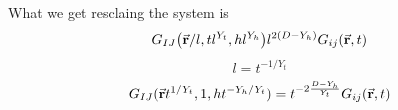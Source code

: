 \documentclass[../main/main.tex]{subfiles}
\begin{document}
What we get resclaing the system is
\begin{equation}
  G_{IJ} \qty(\va{r}/l, t l ^{Y_t}, h l^{Y_h}) l^{2(D-Y_h)} G_{ij} (\va{r},t)
\end{equation}
\begin{equation}
  l = t^{-1/Y_t}
\end{equation}
\begin{equation}
  G_{IJ} (\va{r} t^{1/Y_t}, 1, h t^{-Y_h/Y_t}) = t^{-2 \frac{D- Y_h}{Y_t}} G_{ij} (\va{r},t)
\end{equation}
\end{document}
